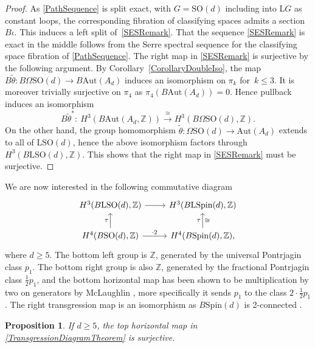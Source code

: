 \documentclass[11pt]{article}
\numberwithin{equation}{section}
\numberwithin{equation}{section}
\newtheorem{Proposition}[Theorem]{Proposition}
\newcommand{\Z}{\mathbb{Z}}
\newcommand{\SO}{\mathrm{SO}}
\newcommand{\Aut}{\mathrm{Aut}}
\newcommand{\Spin}{\mathrm{Spin}}
\renewcommand{\L}{\mathrm{L}}
\begin{document}
\begin{proof}
As \eqref{PathSequence} is split exact, with $G = \SO(d)$ including into $\L G$ as constant loops, the corresponding fibration of classifying spaces admits a section $B\iota$.
This induces a left split of~\eqref{SESRemark}.
That the sequence \eqref{SESRemark} is exact in the middle follows from the Serre spectral sequence for the classifying space fibration of \eqref{PathSequence}.
The right map in \eqref{SESRemark} is surjective by the following argument.
By Corollary~\ref{CorollaryDoubleIso}, the map $B\tilde{\theta}\colon B\Omega \SO(d) \to B \Aut(A_d)$ induces an isomorphism on $\pi_k$ for~$k \leq 3$.
It is moreover trivially surjective on $\pi_4$ as $\pi_4(B\Aut(A_d)) = 0$.
Hence pullback induces an isomorphism
\begin{equation*}
 B\tilde{\theta}^* \colon\ H^3(B \Aut(A_d, \Z)) \stackrel{\cong}{\longrightarrow} H^3(B\Omega \SO(d), \Z).
\end{equation*}
On the other hand, the group homomorphism $\tilde{\theta} \colon \Omega \SO(d) \to \Aut(A_d)$ extends to all of $\L \SO(d)$, hence the above isomorphism factors through $H^3(B\L \SO(d), \Z)$.
This shows that the right map in \eqref{SESRemark} must be surjective.
\end{proof}

We are now interested in the following commutative diagram
\begin{equation}\label{TransgressionDiagramTheorem}
\begin{tikzcd}
 H^3(B\L\SO(d), \Z) \ar[r] & H^3(B\L\Spin(d), \Z) \\
 H^4(B\SO(d), \Z) \ar[u, "\tau"] \ar[r, "\cdot 2"] & H^4(B\Spin(d), \Z), \ar[u, "\tau", "\cong"']
\end{tikzcd}
\end{equation}
where $d\geq 5$.
The bottom left group is $\Z$, generated by the universal Pontrjagin class $p_1$.
The bottom right group is also $\Z$, generated by the fractional Pontrjagin class $\frac{1}{2} p_1$, and the bottom horizontal map has been shown to be multiplication by two on generators by McLaughlin \cite[proof of Lemma~2.2]{McLaughlin}, more specifically it sends $p_1$ to the class $2 \cdot \frac{1}{2} p_1$.
The right transgression map is an isomorphism as $B\Spin(d)$ is 2-connected \cite[p.~149]{McLaughlin}.

\begin{Proposition} \label{PropCommDiagramH3Transgression}
If $d \geq 5$, the top horizontal map in \eqref{TransgressionDiagramTheorem} is surjective.
\end{Proposition}
\end{document}
